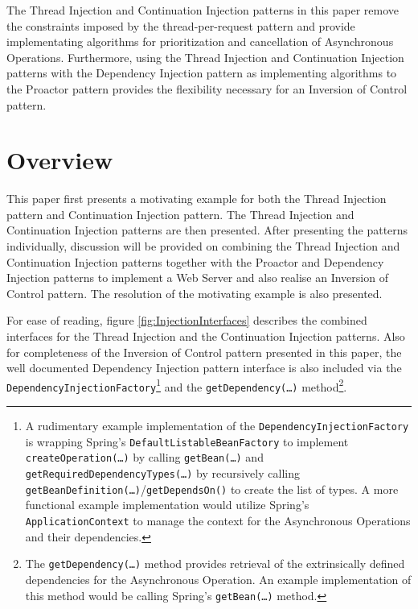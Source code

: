 \documentclass[prodmode]{style/acmlarge}
\begin{document}
The Thread Injection and Continuation Injection patterns in this paper remove
the constraints imposed by the thread-per-request pattern and provide
implementating algorithms for prioritization and cancellation of Asynchronous
Operations.  Furthermore, using the Thread Injection and Continuation Injection
patterns with the Dependency Injection pattern \cite{ioc} as implementing
algorithms to the Proactor pattern provides the flexibility necessary for an
Inversion of Control pattern.


\section{Overview}

This paper first presents a motivating example for both the Thread Injection
pattern and Continuation Injection pattern.  The Thread Injection and
Continuation Injection patterns are then presented.  After presenting the
patterns individually, discussion will be provided on combining the Thread
Injection and Continuation Injection patterns together with the Proactor and
Dependency Injection patterns to implement a Web Server and also realise an
Inversion of Control pattern.  The resolution of the motivating example is also
presented.

For ease of reading, figure \ref{fig:InjectionInterfaces} describes the combined
interfaces for the Thread Injection and the Continuation Injection patterns. 
Also for completeness of the Inversion of Control pattern presented in this
paper, the well documented Dependency Injection pattern \cite{ioc} interface is
also included via the \texttt{DependencyInjectionFactory}\footnote{A rudimentary
example implementation of the \texttt{DependencyInjectionFactory} is wrapping
Spring's \cite{spring} \texttt{DefaultListableBeanFactory} to implement
\texttt{createOperation(\ldots)} by calling \texttt{getBean(\ldots)} and
\texttt{getRequiredDependencyTypes(\ldots)} by recursively calling
\texttt{getBeanDefinition(\ldots)}/\texttt{getDependsOn()} to create the list of
types.  A more functional example implementation would utilize Spring's
\texttt{ApplicationContext} to manage the context for the Asynchronous
Operations and their dependencies.} and the \texttt{getDependency(\ldots)}
method\footnote{The \texttt{getDependency(\ldots)} method provides retrieval of
the extrinsically defined dependencies for the Asynchronous Operation.  An
example implementation of this method would be calling Spring's \cite{spring}
\texttt{getBean(\ldots)} method.}.
\end{document}
